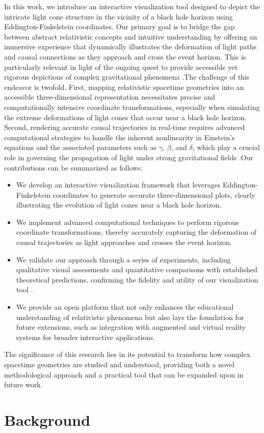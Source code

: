 \documentclass{article}
\begin{document}
In this work, we introduce an interactive visualization tool designed to depict the intricate light cone structure in the vicinity of a black hole horizon using Eddington-Finkelstein coordinates. Our primary goal is to bridge the gap between abstract relativistic concepts and intuitive understanding by offering an immersive experience that dynamically illustrates the deformation of light paths and causal connections as they approach and cross the event horizon. This is particularly relevant in light of the ongoing quest to provide accessible yet rigorous depictions of complex gravitational phenomena \cite{Reference1 Reference2}.The challenge of this endeavor is twofold. First, mapping relativistic spacetime geometries into an accessible three-dimensional representation necessitates precise and computationally intensive coordinate transformations, especially when simulating the extreme deformations of light cones that occur near a black hole horizon. Second, rendering accurate causal trajectories in real-time requires advanced computational strategies to handle the inherent nonlinearity in Einstein's equations and the associated parameters such as $\gamma$, $\beta$, and $\delta$, which play a crucial role in governing the propagation of light under strong gravitational fields \cite{Reference3}.Our contributions can be summarized as follows:\begin{itemize}  \item We develop an interactive visualization framework that leverages Eddington-Finkelstein coordinates to generate accurate three-dimensional plots, clearly illustrating the evolution of light cones near a black hole horizon.  \item We implement advanced computational techniques to perform rigorous coordinate transformations, thereby accurately capturing the deformation of causal trajectories as light approaches and crosses the event horizon.  \item We validate our approach through a series of experiments, including qualitative visual assessments and quantitative comparisons with established theoretical predictions, confirming the fidelity and utility of our visualization tool \cite{Reference4}.  \item We provide an open platform that not only enhances the educational understanding of relativistic phenomena but also lays the foundation for future extensions, such as integration with augmented and virtual reality systems for broader interactive applications.\end{itemize}The significance of this research lies in its potential to transform how complex spacetime geometries are studied and understood, providing both a novel methodological approach and a practical tool that can be expanded upon in future work.\section{Background}
\end{document}
